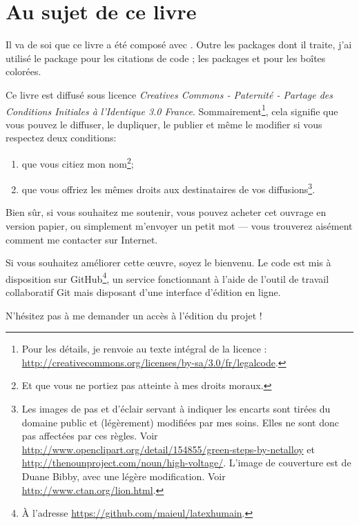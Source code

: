 \section*{Au sujet de ce livre}\thispagestyle{plain}

Il va de soi que ce livre a été composé avec \XeLaTeX. Outre les packages dont il traite, j'ai utilisé le package   pour les citations de code ; les packages  et  pour les boîtes colorées.



Ce livre est diffusé sous licence \emph{Creatives Commons - Paternité - Partage des Conditions Initiales à l'Identique 3.0 France}. Sommairement\footnote{Pour les détails, je renvoie au texte intégral de la licence : \url{http://creativecommons.org/licenses/by-sa/3.0/fr/legalcode}.}, cela signifie que vous pouvez le diffuser, le dupliquer, le publier et même le modifier si vous respectez deux conditions:
\begin{enumerate}
\item que vous citiez mon nom\footnote{Et que vous ne portiez  pas atteinte à mes droits moraux.};
\item que vous offriez les mêmes droits aux destinataires de vos diffusions\footnote{Les images de pas et d'éclair servant à indiquer les encarts sont tirées du domaine public et (légèrement) modifiées par mes soins. Elles ne sont donc pas affectées par ces règles. Voir \url{http://www.openclipart.org/detail/154855/green-steps-by-netalloy} et \url{http://thenounproject.com/noun/high-voltage/}. L'image de couverture est de Duane  Bibby, avec une légère modification. Voir \url{http://www.ctan.org/lion.html}.}.
\end{enumerate}

Bien sûr, si vous souhaitez me soutenir, vous pouvez acheter cet ouvrage en version papier, ou simplement m'envoyer un petit mot --- vous trouverez aisément comment me contacter sur Internet.

Si vous souhaitez améliorer cette œuvre, soyez le bienvenu. Le code est mis à disposition sur GitHub\footnote{À l'adresse \url{https://github.com/maieul/latexhumain}.}, un service fonctionnant à l'aide de l'outil de travail collaboratif Git mais disposant d'une interface d'édition en ligne. 

N'hésitez pas à me demander un accès à l'édition du projet ! 

